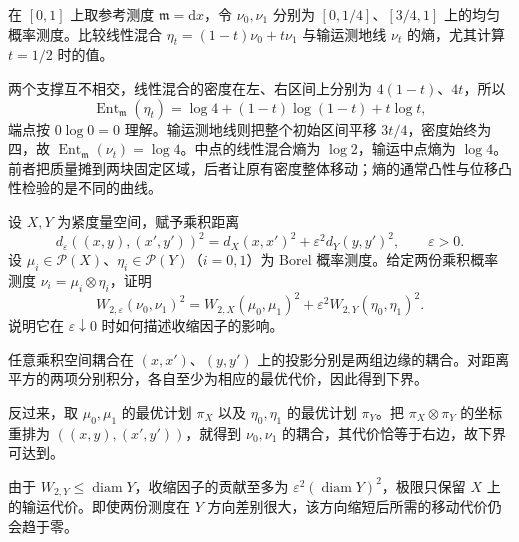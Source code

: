 \begin{exercise}\label{g3:ex:C-entropy-interpolations}
	在 \([0,1]\) 上取参考测度 \(\mathfrak m=\mathrm dx\)，令 \(\nu_0,\nu_1\) 分别为 \([0,1/4]\)、\([3/4,1]\) 上的均匀概率测度。比较线性混合 \(\eta_t=(1-t)\nu_0+t\nu_1\) 与输运测地线 \(\nu_t\) 的熵，尤其计算 \(t=1/2\) 时的值。
\end{exercise}
\begin{solution}
	两个支撑互不相交，线性混合的密度在左、右区间上分别为 \(4(1-t)\)、\(4t\)，所以
	\[
		\operatorname{Ent}_{\mathfrak m}(\eta_t)
		=\log4+(1-t)\log(1-t)+t\log t,
	\]
	端点按 \(0\log0=0\) 理解。输运测地线则把整个初始区间平移 \(3t/4\)，密度始终为四，故 \(\operatorname{Ent}_{\mathfrak m}(\nu_t)=\log4\)。中点的线性混合熵为 \(\log2\)，输运中点熵为 \(\log4\)。前者把质量摊到两块固定区域，后者让原有密度整体移动；熵的通常凸性与位移凸性检验的是不同的曲线。
\end{solution}

\begin{exercise}\label{g3:ex:C-product-transport-collapse}
	设 \(X,Y\) 为紧度量空间，赋予乘积距离
	\[
		d_\varepsilon((x,y),(x',y'))^2
		=d_X(x,x')^2+\varepsilon^2d_Y(y,y')^2,\qquad\varepsilon>0.
	\]
	设 \(\mu_i\in\mathcal P(X)\)、\(\eta_i\in\mathcal P(Y)\)（\(i=0,1\)）为 Borel 概率测度。给定两份乘积概率测度 \(\nu_i=\mu_i\otimes\eta_i\)，证明
	\[
		W_{2,\varepsilon}(\nu_0,\nu_1)^2
		=W_{2,X}(\mu_0,\mu_1)^2+\varepsilon^2W_{2,Y}(\eta_0,\eta_1)^2.
	\]
	说明它在 \(\varepsilon\downarrow0\) 时如何描述收缩因子的影响。
\end{exercise}
\begin{solution}
	任意乘积空间耦合在 \((x,x')\)、\((y,y')\) 上的投影分别是两组边缘的耦合。对距离平方的两项分别积分，各自至少为相应的最优代价，因此得到下界。

	反过来，取 \(\mu_0,\mu_1\) 的最优计划 \(\pi_X\) 以及 \(\eta_0,\eta_1\) 的最优计划 \(\pi_Y\)。把 \(\pi_X\otimes\pi_Y\) 的坐标重排为 \(((x,y),(x',y'))\)，就得到 \(\nu_0,\nu_1\) 的耦合，其代价恰等于右边，故下界可达到。

	由于 \(W_{2,Y}\le\operatorname{diam}Y\)，收缩因子的贡献至多为 \(\varepsilon^2(\operatorname{diam}Y)^2\)，极限只保留 \(X\) 上的输运代价。即使两份测度在 \(Y\) 方向差别很大，该方向缩短后所需的移动代价仍会趋于零。
\end{solution}
